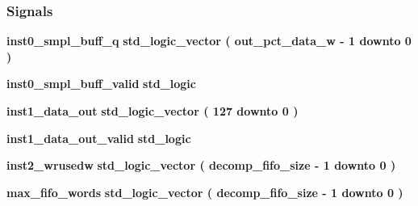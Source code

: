 \subsubsection*{Signals}
 \begin{DoxyCompactItemize}
\item 
{\bf inst0\+\_\+smpl\+\_\+buff\+\_\+q} {\bfseries \textcolor{comment}{std\+\_\+logic\+\_\+vector}\textcolor{vhdlchar}{ }\textcolor{vhdlchar}{(}\textcolor{vhdlchar}{ }\textcolor{vhdlchar}{ }\textcolor{vhdlchar}{ }\textcolor{vhdlchar}{ }{\bfseries {\bf out\+\_\+pct\+\_\+data\+\_\+w}} \textcolor{vhdlchar}{-\/}\textcolor{vhdlchar}{ } \textcolor{vhdldigit}{1} \textcolor{vhdlchar}{ }\textcolor{keywordflow}{downto}\textcolor{vhdlchar}{ }\textcolor{vhdlchar}{ } \textcolor{vhdldigit}{0} \textcolor{vhdlchar}{ }\textcolor{vhdlchar}{)}\textcolor{vhdlchar}{ }} 
\item 
{\bf inst0\+\_\+smpl\+\_\+buff\+\_\+valid} {\bfseries \textcolor{comment}{std\+\_\+logic}\textcolor{vhdlchar}{ }} 
\item 
{\bf inst1\+\_\+data\+\_\+out} {\bfseries \textcolor{comment}{std\+\_\+logic\+\_\+vector}\textcolor{vhdlchar}{ }\textcolor{vhdlchar}{(}\textcolor{vhdlchar}{ }\textcolor{vhdlchar}{ } \textcolor{vhdldigit}{127} \textcolor{vhdlchar}{ }\textcolor{keywordflow}{downto}\textcolor{vhdlchar}{ }\textcolor{vhdlchar}{ } \textcolor{vhdldigit}{0} \textcolor{vhdlchar}{ }\textcolor{vhdlchar}{)}\textcolor{vhdlchar}{ }} 
\item 
{\bf inst1\+\_\+data\+\_\+out\+\_\+valid} {\bfseries \textcolor{comment}{std\+\_\+logic}\textcolor{vhdlchar}{ }} 
\item 
{\bf inst2\+\_\+wrusedw} {\bfseries \textcolor{comment}{std\+\_\+logic\+\_\+vector}\textcolor{vhdlchar}{ }\textcolor{vhdlchar}{(}\textcolor{vhdlchar}{ }\textcolor{vhdlchar}{ }\textcolor{vhdlchar}{ }\textcolor{vhdlchar}{ }{\bfseries {\bf decomp\+\_\+fifo\+\_\+size}} \textcolor{vhdlchar}{-\/}\textcolor{vhdlchar}{ } \textcolor{vhdldigit}{1} \textcolor{vhdlchar}{ }\textcolor{keywordflow}{downto}\textcolor{vhdlchar}{ }\textcolor{vhdlchar}{ } \textcolor{vhdldigit}{0} \textcolor{vhdlchar}{ }\textcolor{vhdlchar}{)}\textcolor{vhdlchar}{ }} 
\item 
{\bf max\+\_\+fifo\+\_\+words} {\bfseries \textcolor{comment}{std\+\_\+logic\+\_\+vector}\textcolor{vhdlchar}{ }\textcolor{vhdlchar}{(}\textcolor{vhdlchar}{ }\textcolor{vhdlchar}{ }\textcolor{vhdlchar}{ }\textcolor{vhdlchar}{ }{\bfseries {\bf decomp\+\_\+fifo\+\_\+size}} \textcolor{vhdlchar}{-\/}\textcolor{vhdlchar}{ } \textcolor{vhdldigit}{1} \textcolor{vhdlchar}{ }\textcolor{keywordflow}{downto}\textcolor{vhdlchar}{ }\textcolor{vhdlchar}{ } \textcolor{vhdldigit}{0} \textcolor{vhdlchar}{ }\textcolor{vhdlchar}{)}\textcolor{vhdlchar}{ }} 

\end{DoxyCompactItemize}
